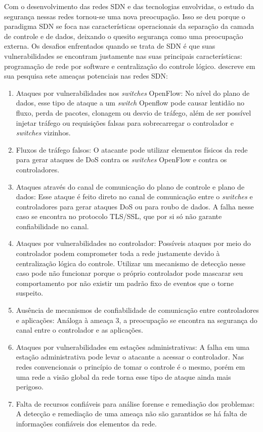 \par Com o desenvolvimento das redes SDN e das tecnologias envolvidas, o estudo da segurança nessas redes tornou-se uma nova preocupação. Isso se deu porque o paradigma SDN se foca nas características operacionais da separação da camada de controle e de dados, deixando o quesito segurança como uma preocupação externa. Os desafios enfrentados quando se trata de SDN é que suas vulnerabilidades se encontram justamente nas suas principais características: programação de rede por software e centralização do controle lógico.  descreve em sua pesquisa sete ameaças potenciais nas redes SDN:

\begin{enumerate}
    \item Ataques por vulnerabilidades nos \emph{switches} OpenFlow: No nível do plano de dados, esse tipo de ataque a um \emph{switch} Openflow pode causar lentidão no fluxo, perda de pacotes, clonagem ou desvio de tráfego, além de ser possível injetar tráfego ou requisições falsas para sobrecarregar o controlador e \textit{switches} vizinhos.
    \item Fluxos de tráfego falsos: O atacante pode utilizar elementos físicos da rede para gerar ataques de DoS contra os \textit{switches} OpenFlow  e contra os controladores. 
    \item Ataques através do canal de comunicação do plano de controle e plano de dados: Esse ataque é feito direto no canal de comunicação entre o \textit{switches} e controladores para gerar ataques DoS ou para roubo de dados. A falha nesse caso se encontra no protocolo TLS/SSL, que por si só não garante confiabilidade no canal.
    \item Ataques por vulnerabilidades no controlador: Possíveis ataques por meio do controlador podem comprometer toda a rede justamente devido à centralização lógica do controle. Utilizar um mecanismo de detecção nesse caso pode não funcionar porque o próprio controlador pode mascarar seu comportamento por não existir um padrão fixo de eventos que o torne suspeito.
    \item Ausência de mecanismos de confiabilidade de comunicação entre controladores e aplicações: Análoga à ameaça 3, a preocupação se encontra na segurança do canal entre o controlador e as aplicações. 
    \item  Ataques por vulnerabilidades em estações administrativas: A falha em uma estação administrativa pode levar o atacante a acessar o controlador. Nas redes convencionais o princípio de tomar o controle é o mesmo, porém em uma rede a visão global da rede torna esse tipo de ataque ainda mais perigoso.
    \item Falta de recursos confiáveis para análise forense e remediação dos problemas: A detecção e remediação de uma ameaça não são garantidos se há falta de informações confiáveis dos elementos da rede.
\end{enumerate}

